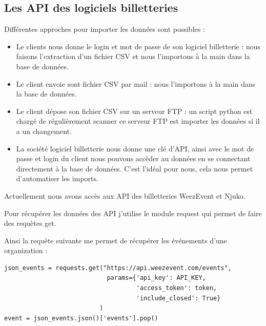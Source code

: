 \subsection{Les API des logiciels billetteries}
Différentes approches pour importer les données sont possibles : 
\begin{itemize}
  \item[\textbullet] Le clients nous donne le login et mot de passe de son logiciel billetterie : nous faisons l'extraction d'un fichier CSV et nous l'importons à la main dans la base de données. 
  \item[\textbullet] Le client envoie sont fichier CSV par mail : nous l'importons à la main dans la base de données.
  \item[\textbullet] Le client dépose son fichier CSV sur un serveur FTP : un script python est chargé de régulièrement scanner ce serveur FTP est importer les données si il a un changement.
  \item[\textbullet] La société logiciel billetterie nous donne une clé d'API, ainsi avec le mot de passe et login du client nous pouvons accèder au données en se connectant directement à la base de données. C'est l'idéal pour nous, cela nous permet d'automatiser les imports.
\end{itemize}

Actuellement nous avons accès aux API des billetteries WeezEvent et Njuko. 

Pour récupérer les données des API j'utilise le module request qui permet de faire des requètes get.

Ainsi la requête suivante me permet de récupérer les événements d'une organization :

\lstset{style=custompython}
\begin{lstlisting}
json_events = requests.get("https://api.weezevent.com/events",
                            params={'api_key': API_KEY,
                                    'access_token': token,
                                    'include_closed': True}
                          )
event = json_events.json()['events'].pop()
\end{lstlisting}
\leavevmode \











